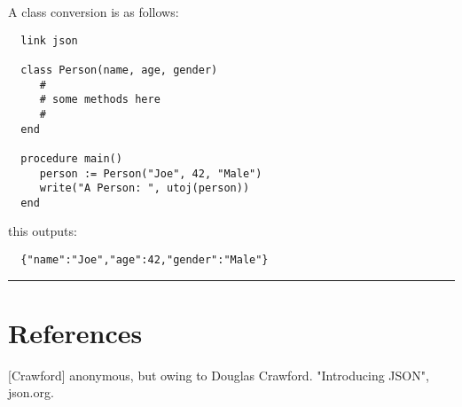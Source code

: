 \documentclass[letterpaper,12pt]{article}
\begin{document}
\begin{description}
A class conversion is as follows:

  \begin{verbatim}
  link json

  class Person(name, age, gender)
     #
     # some methods here
     #
  end

  procedure main()
     person := Person("Joe", 42, "Male")
     write("A Person: ", utoj(person))
  end
  \end{verbatim}

this outputs:

  \begin{verbatim}
  {"name":"Joe","age":42,"gender":"Male"}
  \end{verbatim}


\end{description}

\noindent\rule{\textwidth}{1pt}




\section*{References}

[Crawford] anonymous, but owing to Douglas Crawford.
"Introducing JSON", json.org.
\end{document}
